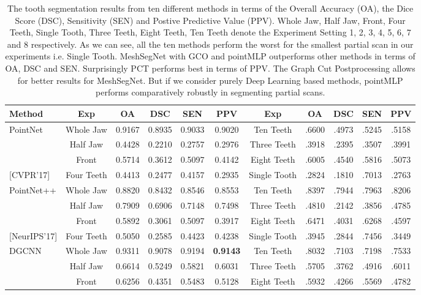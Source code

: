 \documentclass[letterpaper, 10 pt, conference]{ieeeconf}  %
\begin{document}
\begin{table*}[htbp]
\centering
\caption {The tooth segmentation results from ten different methods in terms of the Overall Accuracy (OA),  the Dice Score (DSC), Sensitivity (SEN) and Postive Predictive Value (PPV). Whole Jaw, Half Jaw, Front, Four Teeth, Single Tooth, Three Teeth, Eight Teeth, Ten Teeth denote the Experiment Setting 1, 2, 3, 4, 5, 6, 7 and 8 respectively. As we can see, all the ten methods perform the worst for the smallest partial scan in our experiments i.e. Single Tooth. MeshSegNet with GCO and pointMLP outperforms other methods in terms of OA, DSC and SEN. Surprisingly PCT performs best in terms of PPV. The Graph Cut Postprocessing allows for better results for MeshSegNet. But if we consider purely Deep Learning based methods, pointMLP performs comparatively robustly in segmenting partial scans.}
\begin{tabular}{|l|c|c|c|c | c | c | c | c | c | c |}
\hline
Method & Exp &  OA & DSC & SEN &  PPV & Exp &  OA & DSC & SEN &  PPV \\ \hline
{PointNet}     & Whole Jaw & 0.9167 & 0.8935 & 0.9033 & 0.9020 & Ten Teeth &  .6600 & .4973 & .5245 & .5158 \\
 & Half Jaw  & 0.4428 & 0.2210 & 0.2757 & 0.2976 & Three Teeth  & .3918 & .2395 & .3507 & .3991\\
 & Front & 0.5714 & 0.3612 & 0.5097 & 0.4142 & Eight Teeth & .6005 & .4540 & .5816 & .5073 \\
{[CVPR'17]} & Four Teeth & 0.4413 & 0.2477 & 0.4157 & 0.2935  & Single Tooth & .2824 & .1810 & .7013 & .2763 \\
\hline
{PointNet++ } & Whole Jaw & 0.8820 & 0.8432 & 0.8546 & 0.8553 & Ten Teeth & .8397 & .7944 & .7963 & .8206\\ 
& Half Jaw & 0.7909 & 0.6906 & 0.7148 & 0.7498 & Three Teeth  & .4810 & .2142 & .3856 & .4785\\
& Front & 0.5892 & 0.3061 & 0.5097 & 0.3917 & Eight Teeth & .6471 & .4031 & .6268 & .4597 \\
{[NeurIPS'17]}& Four Teeth & 0.5050 & 0.2585 & 0.4423 & 0.4238 & Single Tooth & .3945 & .2844 & .7456 & .3449 \\
\hline
{DGCNN } & Whole Jaw & 0.9311 & 0.9078 & 0.9194 & \bf{0.9143} & Ten Teeth & .8032 & .7103 & .7198 & .7533 \\
& Half Jaw & 0.6614 & 0.5249 & 0.5821 & 0.6031 & Three Teeth  & .5705 & .3762 & .4916 & .6011\\
& Front &  0.6256 & 0.4351 & 0.5483 & 0.5128 & Eight Teeth & .5932 & .4266 & .5569 & .4782 \\

\end{tabular}
\end{table*}
\end{document}
